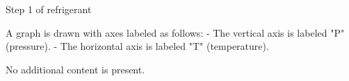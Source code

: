 Step 1 of refrigerant  

A graph is drawn with axes labeled as follows:  
- The vertical axis is labeled "P" (pressure).  
- The horizontal axis is labeled "T" (temperature).  

No additional content is present.